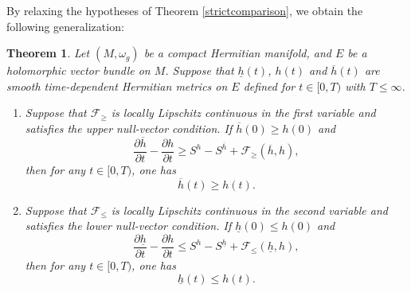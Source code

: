 \documentclass[12pt, reqno]{amsart}
\newcommand\sF{{\mathscr F}}
\theoremstyle{plain}
\newtheorem{thm}{Theorem}[section]
\theoremstyle{definition}
\newcommand{\btheorem}{\begin{thm}}
\newcommand{\etheorem}{\end{thm}}
\newcommand{\p}{\partial}
\newcommand{\beq}{\begin{equation}}
\newcommand{\eeq}{\end{equation}}
\newcommand{\bd}{\begin{enumerate}}
\newcommand{\ed}{\end{enumerate}}
\renewcommand{\>}{\rightarrow}
\renewcommand{\>}{\rightarrow}
\renewcommand{\p}{{\partial}}
\newcommand{\om}{\omega}
\numberwithin{equation}{section} %
\begin{document}
\noindent By relaxing the hypotheses of Theorem \ref{strictcomparison}, we obtain the following generalization:
\btheorem\label{comparison} Let $(M,\om_g)$ be a compact Hermitian manifold, and  $E$ be a holomorphic vector bundle on $M$. Suppose that $\underline h(t)$,   $h(t)$ and $\overline h(t)$ are smooth time-dependent Hermitian metrics on $E$ defined for $t\in [0,T)$ with $T\leq \infty$.
\bd
\item Suppose that $\sF_\geq$  is locally Lipschitz continuous in the first variable and satisfies the upper null-vector condition.
If  $\overline h(0)\geq h(0)$ and
\beq \frac{\p \overline h}{\p t}-\frac{\p h}{\p t}
\geq S^{h}-S^{\overline h}+\sF_{\geq}(\overline h, h),\label{weak upper assumption with F}\eeq
then for any $t\in [0, T)$, one has \beq \overline h(t)\geq h(t).\eeq
\item
Suppose that  $\sF_\leq$  is locally Lipschitz continuous in the second variable and satisfies the lower null-vector condition.
If  $ \underline h(0)\leq h(0)$ and
\beq \frac{\p \underline h}{\p t}-\frac{\p h}{\p t}
\leq S^{h}-S^{\underline h}+\sF_{\leq}( \underline h, h),\label{weak lower assumption with F}\eeq
then for any $t\in [0, T)$, one has \beq  \underline h(t)\leq h(t).\eeq
\ed

\etheorem
\end{document}
